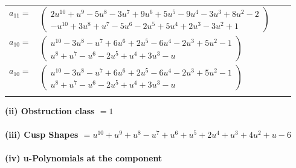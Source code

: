 \documentclass[1p]{elsarticle_modified}
\theoremstyle{definition}
\begin{document}
\begin{tabular}{m{7pt} m{180pt} m{7pt} m{180pt} }
\flushright $a_{11}=$&$\begin{pmatrix}2 u^{10}+u^9-5 u^8-3 u^7+9 u^6+5 u^5-9 u^4-3 u^3+8 u^2-2\\- u^{10}+3 u^8+u^7-5 u^6-2 u^5+5 u^4+2 u^3-3 u^2+1\end{pmatrix}$ \\
\flushright $a_{10}=$&$\begin{pmatrix}u^{10}-3 u^8- u^7+6 u^6+2 u^5-6 u^4-2 u^3+5 u^2-1\\u^8+u^7- u^6-2 u^5+u^4+3 u^3- u\end{pmatrix}$\\ \flushright $a_{10}=$&$\begin{pmatrix}u^{10}-3 u^8- u^7+6 u^6+2 u^5-6 u^4-2 u^3+5 u^2-1\\u^8+u^7- u^6-2 u^5+u^4+3 u^3- u\end{pmatrix}$\\&\end{tabular}
\flushleft \textbf{(ii) Obstruction class $= 1$}\\~\\
\flushleft \textbf{(iii) Cusp Shapes $= u^{10}+u^9+u^8- u^7+u^6+u^5+2 u^4+u^3+4 u^2+u-6$}\\~\\
\newpage\renewcommand{\arraystretch}{1}
\flushleft \textbf{(iv) u-Polynomials at the component}\newline \\
\end{document}
